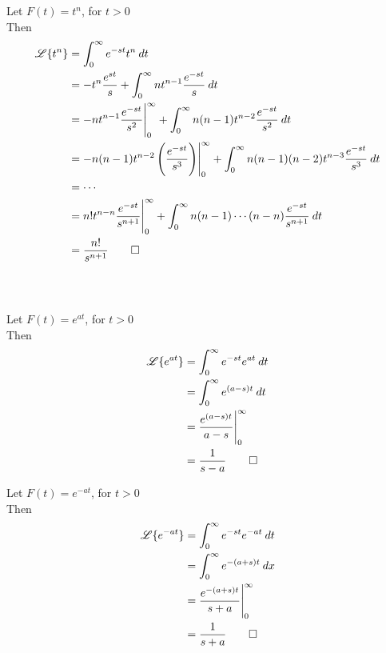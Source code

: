 \documentclass[12pt]{article}
\newcommand{\Lap}{\mathscr{L}}
\begin{document}
\vspace{20pt}
Let $F(t) = t^{n}$, for $t>0$ \\
Then\\
\begin{align*}
    \Lap \{ t^{n} \} &= \int_{0}^{\infty} {e^{-s t}t^n} \: d{t} \\
                     &= -t^n \frac{e^{s t}}{s} + \int_{0}^{\infty} { nt^{n-1} \frac{e^{-s t}}{s} } \: d{t} \\
                     &= \eval{ -nt^{n-1} \frac{e^{-s t}}{s^2} }_{0}^{\infty} + \int_{0}^{\infty} { n(n-1)t^{n-2} \frac{e^{-s t}}{s^2} } \: d{t} \\
                     &= \eval{ -n(n-1)t^{n-2} \left( \frac{e^{-s t}}{s^3} \right) }_{0}^{\infty} + \int_{0}^{\infty} { n(n-1)(n-2)t^{n-3} \frac{e^{-s t}}{s^3} } \: d{t}  \\
                     &= \cdots \\
                     &= \eval{n!t^{n-n}\frac{e^{-s t}}{s^{n+1}}}_{0}^{\infty} + \int_{0}^{\infty} { n(n-1)\cdots(n-n) \frac{e^{-s t}}{s^{n+1}} } \: d{t} \\
                     &= \frac{n!}{s^{n+1}}\qed
\end{align*}\\~\\

\begin{multicols}{2}
    Let $F(t) = e^{at}$, for $t>0$\\
    Then\\
    \begin{align*}
        \Lap \{ e^{at} \} &= \int_{0}^{\infty} { e^{-s t} e^{at} } \: d{t} \\
                          &= \int_{0}^{\infty} { e^{(a-s)t} } \: d{t} \\
                          &= \eval{ \frac{e^{(a-s)t}}{a-s} }_{0}^{\infty} \\
                          &= \frac{1}{s-a}\qed
    \end{align*}
    \columnbreak
    
    Let $F(t)=e^{-at}$, for $t>0$ \\
    Then\\
    \begin{align*}
        \Lap \{ e^{-at} \} &= \int_{0}^{\infty} {e^{-s t} e^{-at}} \: d{t} \\
        &= \int_{0}^{\infty} {e^{-(a+s)t}} \: d{x} \\
        &= \eval{ \frac{e^{-(a+s)t}}{s+a} }_{0}^{\infty} \\
        &= \frac{1}{s+a}\qed
    \end{align*}
\end{multicols}
\end{document}
